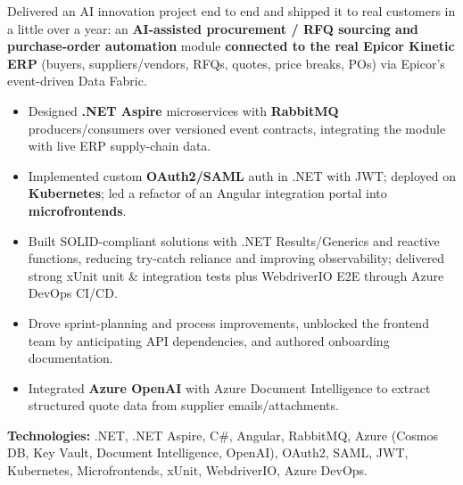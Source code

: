 \documentclass[10pt,a4paper]{altacv}
\begin{document}
Delivered an AI innovation project end to end and shipped it to real customers in a little over a year: an \textbf{AI-assisted procurement / RFQ sourcing and purchase-order automation} module \textbf{connected to the real Epicor Kinetic ERP} (buyers, suppliers/vendors, RFQs, quotes, price breaks, POs) via Epicor's event-driven Data Fabric.
\begin{itemize}
\setlength{\itemindent}{0.5em}
\item[--] Designed \textbf{.NET Aspire} microservices with \textbf{RabbitMQ} producers/consumers over versioned event contracts, integrating the module with live ERP supply-chain data.
\item[--] Implemented custom \textbf{OAuth2/SAML} auth in .NET with JWT; deployed on \textbf{Kubernetes}; led a refactor of an Angular integration portal into \textbf{microfrontends}.
\item[--] Built SOLID-compliant solutions with .NET Results/Generics and reactive functions, reducing try-catch reliance and improving observability; delivered strong xUnit unit \& integration tests plus WebdriverIO E2E through Azure DevOps CI/CD.
\item[--] Drove sprint-planning and process improvements, unblocked the frontend team by anticipating API dependencies, and authored onboarding documentation.
\item[--] Integrated \textbf{Azure OpenAI} with Azure Document Intelligence to extract structured quote data from supplier emails/attachments.
\end{itemize}
\textbf{Technologies:} .NET, .NET Aspire, C\#, Angular, RabbitMQ, Azure (Cosmos DB, Key Vault, Document Intelligence, OpenAI), OAuth2, SAML, JWT, Kubernetes, Microfrontends, xUnit, WebdriverIO, Azure DevOps.

\break
\newpage
{}

\end{document}
